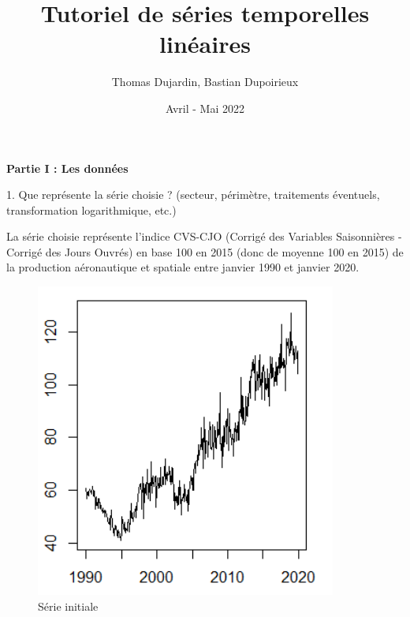 \documentclass[a4paper, 12pt]{article} %
\title{\textbf{Tutoriel de séries temporelles linéaires}}
\author{Thomas Dujardin, Bastian Dupoirieux}
\date{Avril - Mai 2022}
\begin{document}
\maketitle


\Large{\textbf{Partie I : Les données}}
\begin{tcolorbox}
{\small
1. Que représente la série choisie ? (secteur, périmètre, traitements éventuels, transformation logarithmique, etc.)}
\end{tcolorbox}
{\normalsize
{La série choisie représente l'indice CVS-CJO (Corrigé des Variables Saisonnières - Corrigé des Jours Ouvrés) en base 100 en 2015 (donc de moyenne 100 en 2015) de la production aéronautique et spatiale entre janvier 1990 et janvier 2020.}}

\begin{figure}[h]
    \centering
    \includegraphics[scale =0.7]{serie_ae.png}
    \caption{Série initiale}
\end{figure}
\end{document}
